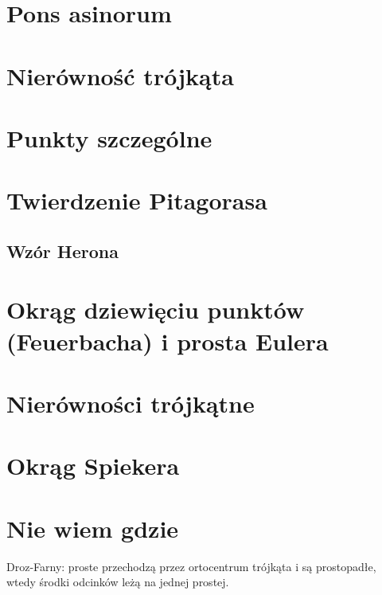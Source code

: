 

\section{Pons asinorum}


\section{Nierówność trójkąta}


\section{Punkty szczególne}


\section{Twierdzenie Pitagorasa}


\subsection{Wzór Herona}


\section{Okrąg dziewięciu punktów (Feuerbacha) i prosta Eulera}


\section{Nierówności trójkątne}


\section{Okrąg Spiekera}


\section{Nie wiem gdzie}

Droz-Farny: proste przechodzą przez ortocentrum trójkąta i są prostopadłe, wtedy środki odcinków leżą na jednej prostej. %

